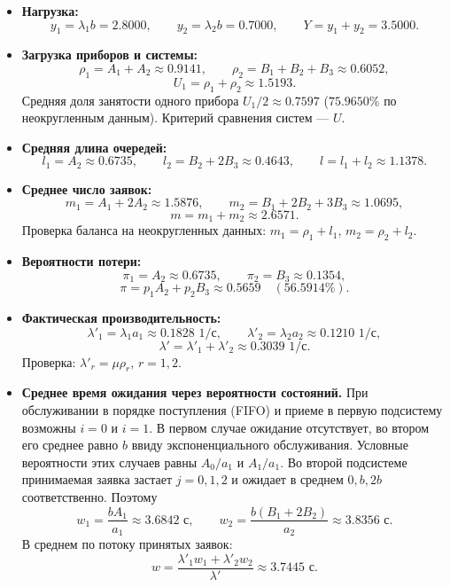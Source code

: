 \documentclass[a4paper,12pt]{article}
\begin{document}
    \begin{itemize}
        \item \textbf{Нагрузка:}
        \[
            y_1=\lambda_1b=2.8000,\qquad y_2=\lambda_2b=0.7000,
            \qquad Y=y_1+y_2=3.5000.
        \]
        \item \textbf{Загрузка приборов и системы:}
        \[
            \rho_1=A_1+A_2\approx0.9141,\qquad
            \rho_2=B_1+B_2+B_3\approx0.6052,
        \]
        \[
            U_1=\rho_1+\rho_2\approx1.5193.
        \]
        Средняя доля занятости одного прибора $U_1/2\approx0.7597$
        ($75.9650\%$ по неокругленным данным). Критерий сравнения систем --- $U$.

        \item \textbf{Средняя длина очередей:}
        \[
            l_1=A_2\approx0.6735,\qquad l_2=B_2+2B_3\approx0.4643,
            \qquad l=l_1+l_2\approx1.1378.
        \]
        \item \textbf{Среднее число заявок:}
        \[
            m_1=A_1+2A_2\approx1.5876,\qquad
            m_2=B_1+2B_2+3B_3\approx1.0695,
        \]
        \[
            m=m_1+m_2\approx2.6571.
        \]
        Проверка баланса на неокругленных данных: $m_1=\rho_1+l_1$,
        $m_2=\rho_2+l_2$.

        \item \textbf{Вероятности потери:}
        \[
            \pi_1=A_2\approx0.6735,\qquad \pi_2=B_3\approx0.1354,
        \]
        \[
            \pi=p_1A_2+p_2B_3\approx0.5659\quad(56.5914\%).
        \]
        \item \textbf{Фактическая производительность:}
        \[
            \lambda'_1=\lambda_1a_1\approx0.1828\text{ 1/с},\qquad
            \lambda'_2=\lambda_2a_2\approx0.1210\text{ 1/с},
        \]
        \[
            \lambda'=\lambda'_1+\lambda'_2\approx0.3039\text{ 1/с}.
        \]
        Проверка: $\lambda'_r=\mu\rho_r$, $r=1,2$.

        \item \textbf{Среднее время ожидания через вероятности состояний.}
        При обслуживании в порядке поступления (FIFO) и приеме в первую подсистему возможны $i=0$ и $i=1$. В первом случае
        ожидание отсутствует, во втором его среднее равно $b$ ввиду
        экспоненциального обслуживания. Условные вероятности этих случаев равны
        $A_0/a_1$ и $A_1/a_1$. Во второй подсистеме принимаемая заявка застает
        $j=0,1,2$ и ожидает в среднем $0,b,2b$ соответственно. Поэтому
        \[
            w_1=\frac{bA_1}{a_1}\approx3.6842\text{ с},\qquad
            w_2=\frac{b(B_1+2B_2)}{a_2}\approx3.8356\text{ с}.
        \]
        В среднем по потоку принятых заявок:
        \[
            w=\frac{\lambda'_1w_1+\lambda'_2w_2}{\lambda'}
            \approx3.7445\text{ с}.
        \]


\end{itemize}
\end{document}
